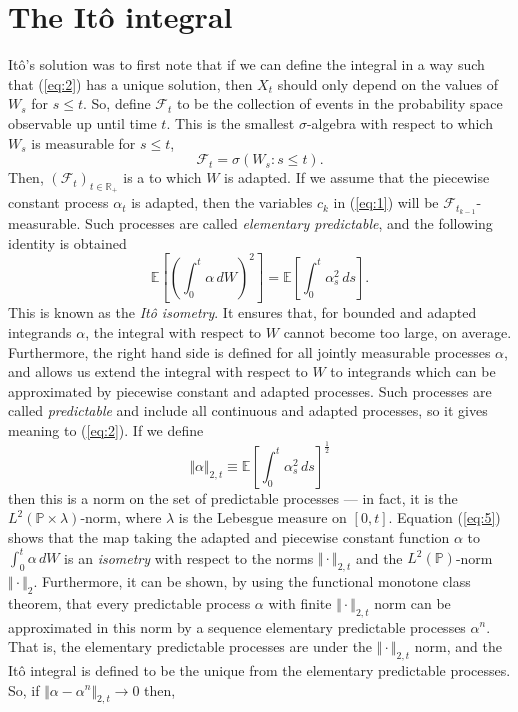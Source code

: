 \documentclass[12pt]{article}
\begin{document}
\section{The It\^o integral}

It\^o's solution was to first note that if we can define the integral in a way such that (\ref{eq:2}) has a unique solution, then $X_t$ should only depend on the values of $W_s$ for $s\le t$. So, define $\mathcal{F}_t$ to be the collection of events in the probability space observable up until time $t$. This is the smallest $\sigma$-algebra with respect to which $W_s$ is measurable for $s\le t$,
\begin{equation*}
\mathcal{F}_t=\sigma\left(W_s:s\le t\right).
\end{equation*}
Then, $(\mathcal{F}_t)_{t\in\mathbb{R}_+}$ is a  to which $W$ is adapted.
If we assume that the piecewise constant process $\alpha_t$ is adapted, then the variables $c_k$ in (\ref{eq:1}) will be $\mathcal{F}_{t_{k-1}}$-measurable. Such processes are called \emph{elementary predictable}, and the following identity is obtained
\begin{equation}\label{eq:5}
\mathbb{E}\left[\left(\int_0^t\alpha\,dW\right)^2\right]=\mathbb{E}\left[\int_0^t\alpha^2_s\,ds\right].
\end{equation}
This is known as the \emph{It\^o isometry}. It ensures that, for bounded and adapted integrands $\alpha$, the integral with respect to $W$ cannot become too large, on average. Furthermore, the right hand side is defined for all jointly measurable processes $\alpha$, and allows us extend the integral with respect to $W$ to integrands which can be approximated by piecewise constant and adapted processes. Such processes are called \emph{predictable} and include all continuous and adapted processes, so it gives meaning to (\ref{eq:2}). If we define
\begin{equation*}
\Vert \alpha\Vert _{2,t}\equiv\mathbb{E}\left[\int_0^t \alpha^2_s\,ds\right]^{\frac{1}{2}}
\end{equation*}
then this is a norm on the set of predictable processes --- in fact, it is the $L^2(\mathbb{P}\times\lambda)$-norm, where $\lambda$ is the Lebesgue measure on $[0,t]$. Equation (\ref{eq:5}) shows that the map taking the adapted and piecewise constant function $\alpha$ to $\int_0^t\alpha\,dW$ is an \emph{isometry} with respect to the norms $\Vert\cdot\Vert_{2,t}$ and the $L^2(\mathbb{P})$-norm $\Vert\cdot\Vert_2$. Furthermore, it can be shown, by using the functional monotone class theorem, that every predictable process $\alpha$ with finite $\Vert\cdot\Vert_{2,t}$ norm can be approximated in this norm by a sequence elementary predictable processes $\alpha^n$. That is, the elementary predictable processes are  under the $\Vert\cdot\Vert_{2,t}$ norm, and the It\^o integral is defined to be the unique  from the elementary predictable processes. So, if $\Vert\alpha-\alpha^n\Vert_{2,t}\rightarrow 0$ then,
\end{document}
